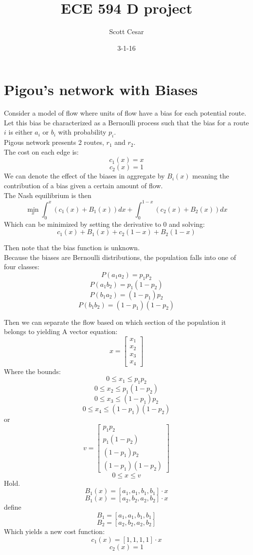 \documentclass[12pt]{article}
\begin{document}
\title{ECE 594 D project}
\author{Scott Cesar}
\date{3-1-16}
\maketitle

\section{Pigou's network with Biases}
Consider a model of flow where units of flow have a bias for each potential route.\\
Let this bias be characterized as a Bernoulli process such that the bias for a route $i$ is either $a_i$ or $b_i$ with probability $p_i$.\\
Pigous network presents 2 routes, $r_1$ and $r_2$.\\
The cost on each edge is:
\[c_1(x) = x\]
\[c_2(x) =1\]
We can denote the effect of the biases in aggregate by $B_i(x)$ meaning the contribution of a bias given a certain amount of flow.\\
The Nash equilibrium is then 
\[\min_x \int_0^x (c_1(x) +B_1(x))dx +  \int_0^{1-x}(c_2(x) +B_2(x))dx\]
Which can be minimized by setting the derivative to 0 and solving:
\[ c_1(x) +B_1(x) +  c_2(1-x) +B_2(1-x)\]

Then note that the bias function is unknown.\\
Because the biases are Bernoulli distributions, the population falls into one of four classes:\\
\[P(a_1a_2) =p_1p_2\]
\[P(a_1b_2) =p_1(1-p_2)\]
\[P(b_1a_2) =(1-p_1)p_2\]
\[P(b_1b_2) =(1-p_1)(1-p_2)\]

Then we can separate the flow based on which section of the population it belongs to yielding A vector equation:\\
\[x= \left[ \begin{array}{c} x_1 \\x_2\\x_3\\x_4 \end{array}\right]\]
Where the bounds:
\[0 \leq x_1 \leq p_1p_2\]
\[0 \leq x_2 \leq p_1(1-p_2)\]
\[0 \leq x_3 \leq (1-p_1)p_2\]
\[0 \leq x_4 \leq (1-p_1)(1-p_2)\]
or
\[v = \left[ \begin{array}{c} p_1p_2 \\p_1(1-p_2)\\(1-p_1)p_2\\(1-p_1)(1-p_2) \end{array}\right]  \]
\[0 \leq x \leq v\]
Hold.
\[B_1(x) = [a_1,a_1,b_1,b_1] \cdot x\]
\[B_1(x) = [a_2,b_2,a_2,b_2] \cdot x\]
define
\[B_1=  [a_1,a_1,b_1,b_1]\]
\[B_2 =  [a_2,b_2,a_2,b_2]\]
Which yields a new cost function:
\[c_1(x) = [1,1,1,1] \cdot x\]
\[c_2(x) =1\]
\end{document}
